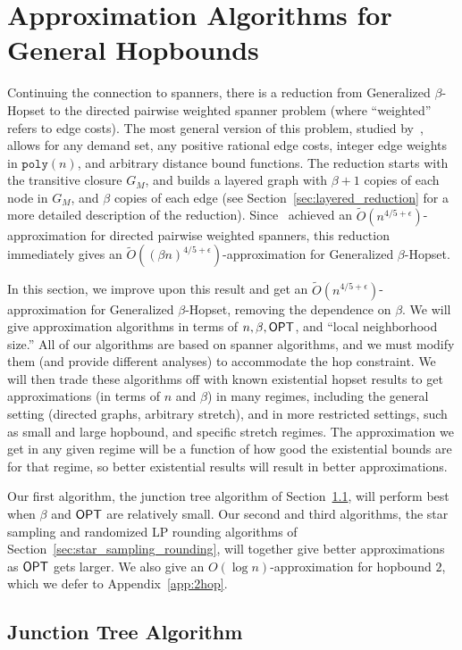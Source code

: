 \documentclass{article}
\theoremstyle{definition}
\theoremstyle{remark}
\def\be    {\beta}
\def\opt {{\sf OPT}}
\def\hopset {{\sc Generalized $\beta$-Hopset}}
\begin{document}
\section{Approximation Algorithms for General Hopbounds}
Continuing the connection to spanners, there is a reduction from {\hopset} to the directed pairwise weighted spanner problem (where ``weighted'' refers to edge costs). The most general version of this problem, studied by~\cite{GKL23}, allows for any demand set, any positive rational edge costs, integer edge weights in $\texttt{poly}(n)$, and arbitrary distance bound functions. The reduction starts with the transitive closure $G_M$, and builds a layered graph with $\beta + 1$ copies of each node in $G_M$, and $\be$ copies of each edge (see Section~\ref{sec:layered_reduction} for a more detailed description of the reduction). Since~\cite{GKL23} achieved an $\widetilde{O}(n^{4/5 + \epsilon})$-approximation for directed pairwise weighted spanners, this reduction immediately gives an $\widetilde{O}((\be n)^{4/5 + \epsilon})$-approximation for {\hopset}. 

In this section, we improve upon this result and get an $\widetilde{O}(n^{4/5 + \epsilon})$-approximation for {\hopset}, removing the dependence on $\be$. We will give approximation algorithms in terms of $n, \be, {\opt}$, and ``local neighborhood size.'' All of our algorithms are based on spanner algorithms, and we must modify them (and provide different analyses) to accommodate the hop constraint. We will then trade these algorithms off with known existential hopset results to get approximations (in terms of $n$ and $\be$) in many regimes, including the general setting (directed graphs, arbitrary stretch), and in more restricted settings, such as small and large hopbound, and specific stretch regimes. The approximation  we get in any given regime will be a function of how good the existential bounds are for that regime, so better existential results will result in better approximations.

Our first algorithm, the junction tree algorithm of Section~\ref{sec:junction_tree}, will perform best when ${\be}$ and ${\opt}$ are relatively small. Our second and third algorithms, the star sampling and randomized LP rounding algorithms of Section~\ref{sec:star_sampling_rounding}, will together give better approximations as ${\opt}$ gets larger. 
\iflong\else We also give an $O(\log n)$-approximation for hopbound $2$, which we defer to Appendix~\ref{app:2hop}.\fi


\subsection{Junction Tree Algorithm} \label{sec:junction_tree}
\end{document}
